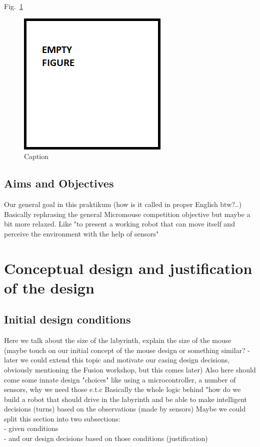 \documentclass[12pt]{article}
\begin{document}
Fig.~\ref{fig:micromouse} 
    
\begin{figure}[htb]
    \centering
    \includegraphics{figures/filler.png}
    \caption{Caption}
    \label{fig:micromouse}
\end{figure}

\subsection{Aims and Objectives}
    Our general goal in this praktikum (how is it called in proper English btw?..)
    Basically rephrasing the general Micromouse competition objective but maybe a bit more relaxed. Like "to present a working robot that can move itself and perceive the environment with the help of sensors"

\section{Conceptual design and justification of the design}

\subsection{Initial design conditions}
    Here we talk about the size of the labyrinth, explain the size of the mouse (maybe touch on our initial concept of the mouse design or something similar? - later we could extend this topic and motivate our casing design decisions, obviously mentioning the Fusion workshop, but this comes later)
    Also here should come some innate design "choices" like using a microcontroller, a number of sensors, why we need those e.t.c
    Basically the whole logic behind "how do we build a robot that should drive in the labyrinth and be able to make intelligent decisions (turns) based on the observations (made by sensors)
    Maybe we could split this section into two subsections:\\
    - given conditions\\
    - and our design decisions based on those conditions (justification)
    
\end{document}
